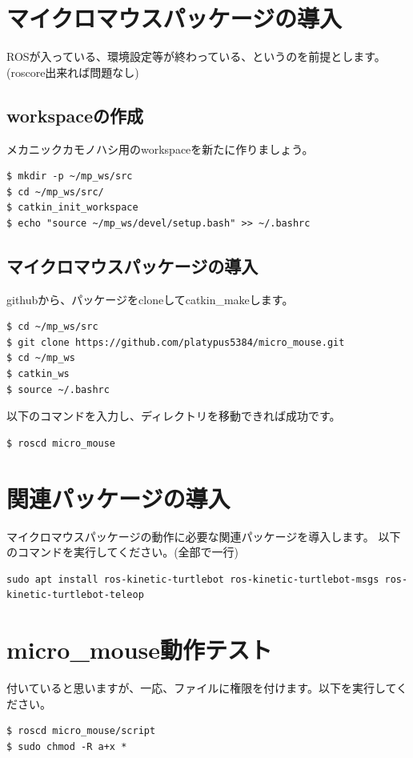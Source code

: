\documentclass[11pt,a4paper]{jsarticle}
\begin{document}
\section{マイクロマウスパッケージの導入}
ROSが入っている、環境設定等が終わっている、というのを前提とします。(roscore出来れば問題なし)
\subsection{workspaceの作成}
メカニックカモノハシ用のworkspaceを新たに作りましょう。

\begin{lstlisting}[frame=single]
$ mkdir -p ~/mp_ws/src
$ cd ~/mp_ws/src/
$ catkin_init_workspace
$ echo "source ~/mp_ws/devel/setup.bash" >> ~/.bashrc
\end{lstlisting}


\subsection{マイクロマウスパッケージの導入}
githubから、パッケージをcloneしてcatkin\_makeします。
\begin{lstlisting}[frame=single]
$ cd ~/mp_ws/src
$ git clone https://github.com/platypus5384/micro_mouse.git
$ cd ~/mp_ws
$ catkin_ws
$ source ~/.bashrc
\end{lstlisting}

以下のコマンドを入力し、ディレクトリを移動できれば成功です。
\begin{lstlisting}[frame=single]
$ roscd micro_mouse
\end{lstlisting}


\newpage

\section{関連パッケージの導入}
マイクロマウスパッケージの動作に必要な関連パッケージを導入します。
以下のコマンドを実行してください。(全部で一行)
\begin{lstlisting}[frame=single, caption=roscd, label=roscd]
sudo apt install ros-kinetic-turtlebot ros-kinetic-turtlebot-msgs ros-kinetic-turtlebot-teleop 
\end{lstlisting}

\section{micro\_mouse動作テスト}
付いていると思いますが、一応、ファイルに権限を付けます。以下を実行してください。
\begin{lstlisting}[frame=single, caption=roscd, label=roscd]
$ roscd micro_mouse/script
$ sudo chmod -R a+x *
\end{lstlisting}
\end{document}
